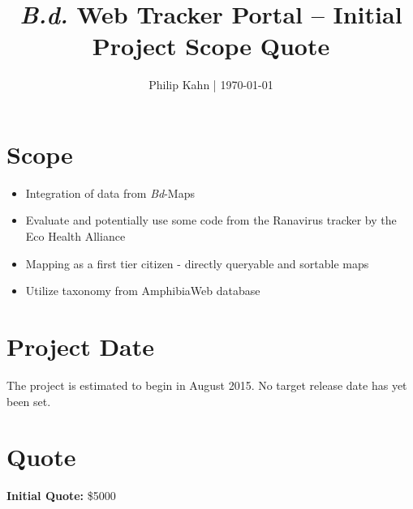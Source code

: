\documentclass{article}
\begin{document}
\title{\textit{B.d.} Web Tracker Portal -- Initial Project Scope Quote}
\author{Philip Kahn | \today}

\maketitle


\section{Scope}

\begin{itemize}
  \item Integration of data from \textit{Bd}-Maps
  \item Evaluate and potentially use some code from the Ranavirus tracker by the Eco Health Alliance
  \item Mapping as a first tier citizen - directly queryable and sortable maps
  \item Utilize taxonomy from AmphibiaWeb database
\end{itemize}

\section{Project Date}

The project is estimated to begin in  August 2015. No target release date has yet been set.

\section{Quote}

\textbf{Initial Quote:} \$5000
\end{document}
